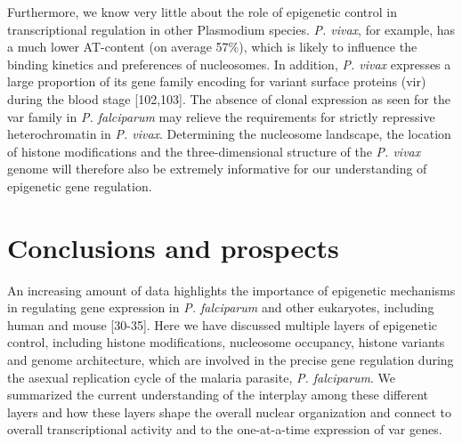 Furthermore, we know very little about the role of epigenetic control in
transcriptional regulation in other Plasmodium species. \textit{P. vivax}, for example,
has a much lower AT-content (on average 57\%), which is likely to influence the
binding kinetics and preferences of nucleosomes. In addition, \textit{P.
vivax}
expresses a large proportion of its gene family encoding for variant surface
proteins (vir) during the blood stage \citep{bozdeh:transcriptome,
fernandez-becerra:variant} [102,103]. The absence of clonal
expression as seen for the var family in \textit{P. falciparum} may relieve the
requirements for strictly repressive heterochromatin in \textit{P. vivax}. Determining
the nucleosome landscape, the location of histone modifications and the
three-dimensional structure of the \textit{P. vivax} genome will therefore also be
extremely informative for our understanding of epigenetic gene regulation.


\section{Conclusions and prospects}
An increasing amount of data highlights the importance of epigenetic
mechanisms in regulating gene expression in \textit{P. falciparum} and other
eukaryotes, including human and mouse \citep{ay:three-dimensional,
dixon:topological, duan:three-dimensional, lemieux:genome-wide,
lieberman-aiden:comprehensive, sexton:three-dimensional} [30-35].
Here we have discussed multiple
layers of epigenetic control, including histone modifications, nucleosome
occupancy, histone variants and genome architecture, which are involved in the
precise gene regulation during the asexual replication cycle of the malaria
parasite, \textit{P. falciparum}. We summarized the current understanding of the
interplay among these different layers and how these layers shape the overall
nuclear organization and connect to overall transcriptional activity and to
the one-at-a-time expression of var genes.

